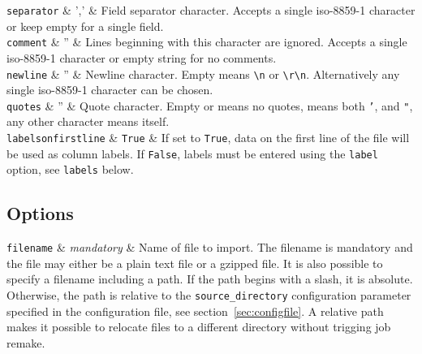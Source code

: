  \RP \texttt{separator} & ',' & Field separator character.  Accepts a
 single iso-8859-1 character or keep empty for a single field. \\[1ex]

 \RP \texttt{comment} & '' & Lines beginning with this character are
 ignored.  Accepts a single iso-8859-1 character or empty string for
 no comments. \\[1ex]

\RP \texttt{newline} & '' & Newline character.  Empty means
\texttt{\textbackslash{}n} or \texttt{\textbackslash{}r\textbackslash{}n}.
Alternatively any single iso-8859-1 character can be chosen.\\[1ex]

\RP \texttt{quotes} & '' & Quote character.  Empty or \pyFalse means no
quotes, \pyTrue means both \texttt{'}, and \texttt{"}, any other
character means itself. \\[1ex]

\RP \texttt{labelsonfirstline} & \texttt{True} & If set to
\texttt{True}, data on the first line of the file will
be used as column labels.  If \texttt{False}, labels must
be entered using the \texttt{label} option, see \texttt{labels}
below.\\



\stoptable




\subsection{Options}

\starttable
  \RP \texttt{filename} & \emph{mandatory} & Name of file to import.
  The filename is mandatory and the file may either be a plain text
  file or a gzipped file.  It is also possible to specify a filename
  including a path.  If the path begins with a slash, it is absolute.
  Otherwise, the path is relative to the \texttt{source\_directory}
  configuration parameter specified in the configuration file, see
  section~\ref{sec:configfile}.  A relative path makes it possible to
  relocate files to a different directory without trigging job
  remake.\\
  
